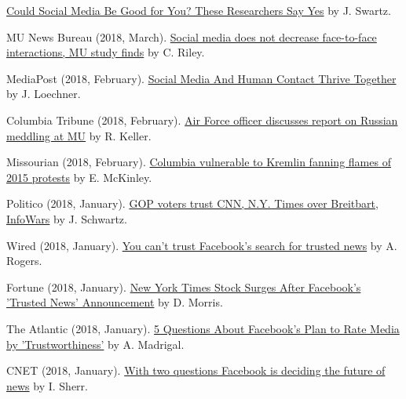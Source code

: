 \begin{bibenum}
      \href{https://www.barrons.com/articles/could-social-media-be-good-for-you-these-researchers-say-yes-1519932207}{Could Social Media Be Good for You? These Researchers Say Yes} by J. Swartz.
    \item[] MU News Bureau (2018, March).
      \href{https://munews.missouri.edu/news-releases/2018/0301-social-media-does-not-decrease-face-to-face-interactions-mu-study-finds/}{Social media does not decrease face-to-face interactions, MU study finds} by C. Riley.
    \item[] MediaPost (2018, February).
      \href{https://mediapost.com/publications/article/315106/social-media-and-human-contact-thrive-together.html}{Social Media And Human Contact Thrive Together} by J. Loechner.
    \item[] Columbia Tribune (2018, February).
      \href{http://www.columbiatribune.com/news/20180217/air-force-officer-discusses-report-on-russian-meddling-at-mu}{Air Force officer discusses report on Russian meddling at MU} by R. Keller.
    \item[] Missourian (2018, February).
      \href{https://www.columbiamissourian.com/news/higher_education/columbia-vulnerable-to-kremlin-fanning-flames-of-protests/article_929cf366-11ad-11e8-9631-63ac0b4a6fd3.html}{Columbia vulnerable to Kremlin fanning flames of 2015 protests} by E. McKinley.
    \item[] Politico (2018, January).
      \href{https://www.politico.com/amp/story/2018/02/06/gop-republican-voters-media-bias-trusted-sites-393650}{ GOP voters trust CNN, N.Y. Times over Breitbart, InfoWars} by J. Schwartz.
    \item[] Wired (2018, January).
      \href{https://www.wired.com/story/you-cant-trust-facebooks-search-for-trusted-news/}{You can't trust Facebook's search for trusted news} by A. Rogers.
    \item[] Fortune (2018, January).
      \href{http://fortune.com/2018/01/21/new-york-times-stock-facebooks-trusted-news/}{New York Times Stock Surges After Facebook's 'Trusted News' Announcement} by D. Morris.
    \item[] The Atlantic (2018, January).
      \href{https://www.theatlantic.com/technology/archive/2018/01/facebook-media-trustworthiness/551045/}{5 Questions About Facebook's Plan to Rate Media by 'Trustworthiness'} by A. Madrigal.
    \item[] CNET (2018, January).
      \href{https://www.cnet.com/news/with-two-questions-facebook-is-deciding-the-future-of-news-zuckerberg-fake-news/}{With two questions Facebook is deciding the future of news} by I. Sherr.

\end{bibenum}
